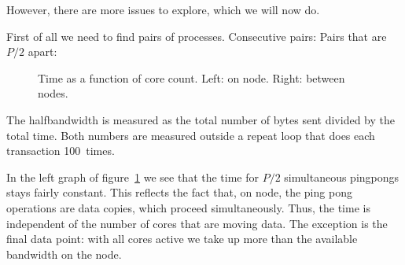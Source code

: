 However, there are more issues to explore,
which we will now do.

First of all we need to find pairs of processes.
Consecutive pairs:
Pairs that are $P/2$ apart:

\begin{figure}[ht]
  \pgfplotsset{width=3.5in,compat=1.7}
  \hbox\bgroup %

  \egroup %
  \caption{Time as a function of core count. Left: on node. Right: between nodes.}
  \label{fig:hbw-interintra}
\end{figure}

The halfbandwidth is measured as the total number of bytes sent
divided by the total time.
Both numbers are measured outside a repeat loop that does each
transaction 100~times.
%

In the left graph of figure~\ref{fig:hbw-interintra} we see that the time
for $P/2$ simultaneous pingpongs stays fairly constant.
This reflects the fact that, on node, the ping pong operations are
data copies, which proceed simultaneously.
Thus, the time is independent of the number of cores that are moving data.
The exception is the final data point: with all cores active we take up
more than the available bandwidth on the node.

